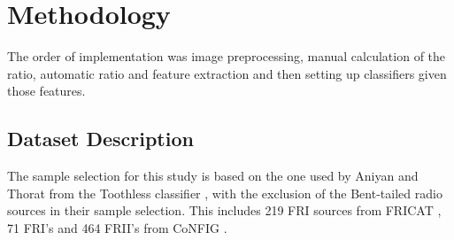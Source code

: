 \documentclass[conference]{IEEEtran}
\begin{document}



\section{Methodology}
The order of implementation was image preprocessing, manual calculation of the ratio, automatic ratio and feature extraction and then setting up classifiers given those features.

\subsection{Dataset Description}
The sample selection for this study is based on the one used by Aniyan and Thorat from the Toothless classifier \cite{aniyan_thorat_2017}, with the exclusion of the Bent-tailed radio sources in their sample selection. This includes 219 FRI sources from FRICAT \cite{capetti_2016}, 71 FRI's and 464 FRII's from CoNFIG \cite{gendre_wall_2009}.
\end{document}
